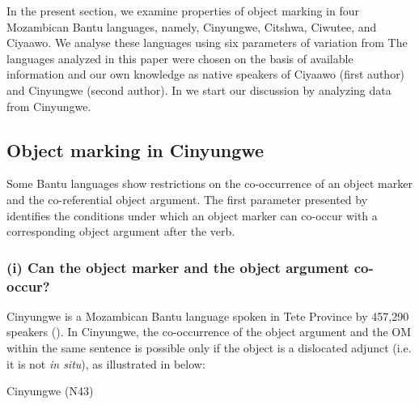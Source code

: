 \documentclass[output=paper]{langscibook}
\begin{document}
In the present section, we examine properties of object marking in four Mozambican Bantu languages, namely, Cinyungwe, Citshwa, Ciwutee, and Ciyaawo. We analyse these languages using six parameters of variation from \citet{MartenKula2012} The languages analyzed in this paper were chosen on the basis of available information and our own knowledge as native speakers of Ciyaawo (first author) and Cinyungwe (second author). In  we start our discussion by analyzing data from Cinyungwe.


\subsection{Object marking in Cinyungwe} \label{sec:ngunga:3.1}
\begin{sloppypar}
Some Bantu languages show restrictions on the co-occurrence of an object marker and the co-referential object argument. The first parameter presented by \citet{MartenKula2012} identifies the conditions under which an object marker can co-occur with a corresponding object argument after the verb.
\end{sloppypar}

\subsubsection{(i) Can the object marker and the object argument co-occur?}

Cinyungwe is a Mozambican Bantu language spoken in Tete Province by 457,290 speakers (\citealt[108]{NgungaFaquir2011}). In Cinyungwe, the co-occurrence of the object argument and the OM within the same sentence is possible only if the object is a dislocated adjunct (i.e. it is not \textit{in situ}), as illustrated in  below:

\ea\label{ex:ngunga:21}  Cinyungwe    (N43)\\
\end{document}
